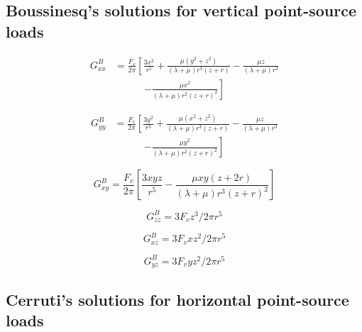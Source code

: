 \documentclass[twocolumn,jgrga]{AGUTeX}
\begin{document}
\begin{article}
{{\subsection{Boussinesq's solutions for vertical point-source
loads}\label{boussinesqs-solutions-for-vertical-point-source-loads}

\begin{equation}
\begin{split}
G_{xx}^B & = \frac{ F_v }{ 2\pi } \left[ \frac{ 3x^2 }{ r^5 } \right.
+ \frac{\mu (y^2 + z^2)}{(\lambda + \mu) r^3 (z + r)}
- \frac{\mu z}{(\lambda + \mu) r^3} \\
&\qquad \quad \left. - \frac{\mu x^2}{ (\lambda + \mu) r^2 (z + r)^2 }\right ]
\end{split}
\end{equation}

\begin{equation}
\begin{split}
G_{yy}^B & = \frac{F_v}{2\pi } \left [ \frac{3y^2}{r^5} \right.
+ \frac{\mu (x^{2} + z^{2})}{(\lambda + \mu) r^{3}(z + r)}
- \frac{\mu z}{(\lambda + \mu) r ^{3}} \\
& \qquad \quad \left. - \frac{\mu y^{2}}{(\lambda + \mu ) r^2 (z +r)^2} \right]
\end{split}
\end{equation}

\begin{equation}
G_{xy}^{B} = \frac{F _{v}}{2\pi} \left[ \frac{3xyz}{r^{5}}
- \frac{\mu x y (z + 2r)}{(\lambda + \mu) r^{3} (z + r)^{2}} \right]
\end{equation}

\begin{equation}
G_{zz}^{B} = 3 F _{v} z^{3} / 2 \pi r^{5}
\end{equation}

\begin{equation}
G_{xz}^{B} = 3 F _{v} xz^{2} / 2 \pi r^{5}
\end{equation}

\begin{equation}
G_{yz}^{B} = 3 F _{v} yz^{2} / 2 \pi r^{5}
\end{equation}

\subsection{Cerruti's solutions for horizontal point-source
loads}\label{cerrutis-solutions-for-horizontal-point-source-loads}

}}
\end{article}
\end{document}
